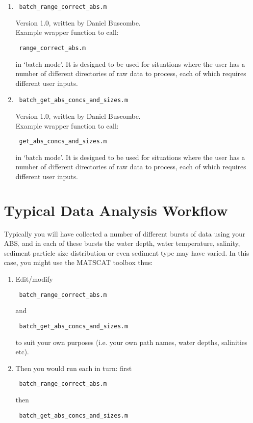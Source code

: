 \documentclass[a4paper,10pt]{report}
\begin{document}
\begin{enumerate}
 \item
\begin{verbatim} batch_range_correct_abs.m \end{verbatim}
Version 1.0, written by Daniel Buscombe.\\
Example wrapper function to call:
\begin{verbatim} range_correct_abs.m \end{verbatim}
in `batch mode'. It is designed to be used for situations where the user has a number of different directories of raw data to process, each of which requires different user inputs.

 \item
\begin{verbatim} batch_get_abs_concs_and_sizes.m \end{verbatim}
Version 1.0, written by Daniel Buscombe.\\
Example wrapper function to call:
\begin{verbatim} get_abs_concs_and_sizes.m \end{verbatim}
in `batch mode'. It is designed to be used for situations where the user has a number of different directories of raw data to process, each of which requires different user inputs.

\end{enumerate}

\clearpage
\section{Typical Data Analysis Workflow}

Typically you will have collected a number of different bursts of data using your ABS, and in each of these bursts the water depth, water temperature, salinity, sediment particle size distribution or even sediment type may have varied. In this case, you might use the MATSCAT toolbox thus:

\begin{enumerate}
 \item Edit/modify \begin{verbatim} batch_range_correct_abs.m \end{verbatim} and \begin{verbatim} batch_get_abs_concs_and_sizes.m \end{verbatim} to suit your own purposes (i.e. your own path names, water depths, salinities etc). 
 \item Then you would run each in turn: first \begin{verbatim} batch_range_correct_abs.m \end{verbatim} then \begin{verbatim} batch_get_abs_concs_and_sizes.m \end{verbatim}
\end{enumerate}
\end{document}
